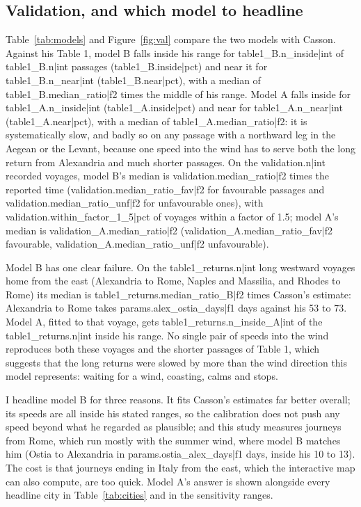 \documentclass[11pt,a4paper]{article}
\begin{document}
\subsection{Validation, and which model to headline}\label{sec:val}
Table~\ref{tab:models} and Figure~\ref{fig:val} compare the two models with Casson. Against his Table 1, model B falls inside his range for {{table1_B.n_inside|int}} of {{table1_B.n|int}} passages ({{table1_B.inside|pct}}) and near it for {{table1_B.n_near|int}} ({{table1_B.near|pct}}), with a median of {{table1_B.median_ratio|f2}} times the middle of his range. Model A falls inside for {{table1_A.n_inside|int}} ({{table1_A.inside|pct}}) and near for {{table1_A.n_near|int}} ({{table1_A.near|pct}}), with a median of {{table1_A.median_ratio|f2}}: it is systematically slow, and badly so on any passage with a northward leg in the Aegean or the Levant, because one speed into the wind has to serve both the long return from Alexandria and much shorter passages. On the {{validation.n|int}} recorded voyages, model B's median is {{validation.median_ratio|f2}} times the reported time ({{validation.median_ratio_fav|f2}} for favourable passages and {{validation.median_ratio_unf|f2}} for unfavourable ones), with {{validation.within_factor_1_5|pct}} of voyages within a factor of 1.5; model A's median is {{validation_A.median_ratio|f2}} ({{validation_A.median_ratio_fav|f2}} favourable, {{validation_A.median_ratio_unf|f2}} unfavourable).

Model B has one clear failure. On the {{table1_returns.n|int}} long westward voyages home from the east (Alexandria to Rome, Naples and Massilia, and Rhodes to Rome) its median is {{table1_returns.median_ratio_B|f2}} times Casson's estimate: Alexandria to Rome takes {{params.alex_ostia_days|f1}} days against his 53 to 73. Model A, fitted to that voyage, gets {{table1_returns.n_inside_A|int}} of the {{table1_returns.n|int}} inside his range. No single pair of speeds into the wind reproduces both these voyages and the shorter passages of Table 1, which suggests that the long returns were slowed by more than the wind direction this model represents: waiting for a wind, coasting, calms and stops.

I headline model B for three reasons. It fits Casson's estimates far better overall; its speeds are all inside his stated ranges, so the calibration does not push any speed beyond what he regarded as plausible; and this study measures journeys from Rome, which run mostly with the summer wind, where model B matches him (Ostia to Alexandria in {{params.ostia_alex_days|f1}} days, inside his 10 to 13). The cost is that journeys ending in Italy from the east, which the interactive map can also compute, are too quick. Model A's answer is shown alongside every headline city in Table~\ref{tab:cities} and in the sensitivity ranges.
\end{document}
